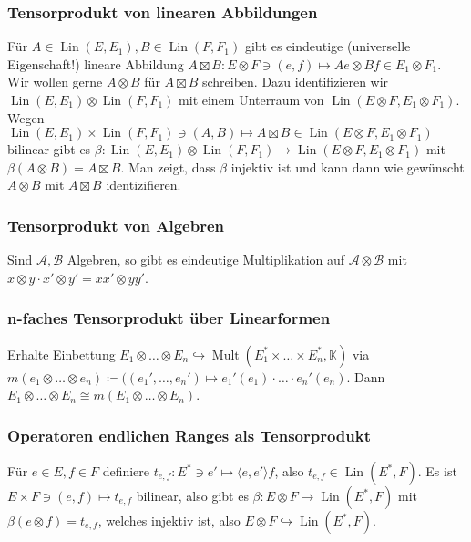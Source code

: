 \documentclass[11pt,a4paper]{scrartcl}
\newcommand{\K}{\mathbb{K}} %
\newcommand{\A}{\mathcal{A}}
\newcommand{\B}{\mathcal{B}}
\theoremstyle{plain}
\theoremstyle{definition}
\theoremstyle{remark}
\DeclareMathOperator{\Lin}{Lin}
\DeclareMathOperator{\Mult}{Mult}
\begin{document}
\subsubsection{Tensorprodukt von linearen Abbildungen}

Für $A\in \Lin(E,E_1), B\in \Lin(F,F_1)$ gibt es eindeutige (universelle Eigenschaft!) lineare Abbildung $A\boxtimes B: E\otimes F \ni (e,f)\mapsto Ae\otimes Bf \in E_1\otimes F_1$. Wir wollen gerne $A\otimes B$ für $A\boxtimes B$ schreiben. Dazu identifizieren wir $\Lin(E,E_1)\otimes \Lin(F,F_1)$ mit einem Unterraum von $\Lin(E\otimes F, E_1\otimes F_1)$. Wegen $\Lin(E,E_1)\times \Lin(F,F_1) \ni (A,B) \mapsto A\boxtimes B \in \Lin(E\otimes F, E_1\otimes F_1)$ bilinear gibt es $\beta: \Lin(E,E_1)\otimes \Lin(F,F_1) \to \Lin(E\otimes F, E_1\otimes F_1)$ mit $\beta(A\otimes B) = A\boxtimes B$. Man zeigt, dass $\beta$ injektiv ist und kann dann wie gewünscht $A\otimes B$ mit $A\boxtimes B$ identizifieren.

\subsubsection{Tensorprodukt von Algebren}

Sind $\A,\B$ Algebren, so gibt es eindeutige Multiplikation auf $\A\otimes \B$ mit $x\otimes y \cdot x'\otimes y' = xx'\otimes yy'$.

\subsubsection{n-faches Tensorprodukt über Linearformen}

Erhalte Einbettung $E_1\otimes \dots \otimes E_n \hookrightarrow \Mult(E_1^*\times \dots \times E_n^*, \K)$ via $m(e_1\otimes \dots \otimes e_n) \coloneqq ((e_1', \dots, e_n')\mapsto e_1'(e_1)\cdot \dots \cdot e_n'(e_n)$. Dann $E_1\otimes \dots \otimes E_n \cong m(E_1\otimes \dots \otimes E_n)$.

\subsubsection{Operatoren endlichen Ranges als Tensorprodukt}

Für $e\in E, f\in F$ definiere $t_{e,f}: E^*\ni e' \mapsto \langle e, e' \rangle f$, also $t_{e,f}\in \Lin(E^*,F)$. Es ist $E\times F \ni (e,f) \mapsto t_{e,f}$ bilinear, also gibt es $\beta: E\otimes F \to \Lin(E^*,F)$ mit $\beta(e\otimes f) = t_{e,f}$, welches injektiv ist, also $E\otimes F \hookrightarrow \Lin(E^*,F)$.
\end{document}
